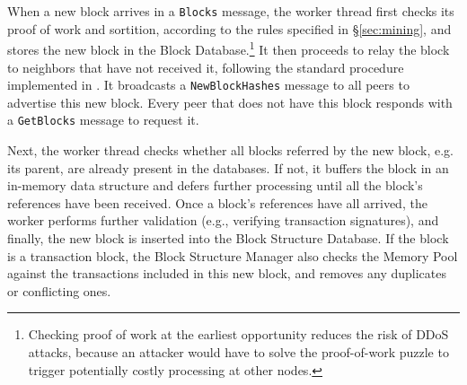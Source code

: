 When a new block arrives in a \texttt{Blocks} message, the worker thread first checks its proof of work and sortition, according to the rules specified in \S\ref{sec:mining}, and stores the new block in the Block Database.\footnote{Checking proof of work at the earliest opportunity reduces the risk of DDoS attacks, because an attacker would have to solve the proof-of-work puzzle to trigger potentially costly processing at other nodes.} It then proceeds to relay the block to neighbors that have not received it, following the standard procedure implemented in \bitcoin. It broadcasts a \texttt{NewBlockHashes} message to all peers to advertise this new block. Every peer that does not have this block responds with a \texttt{GetBlocks} message to request it. 

Next, the worker thread checks whether all blocks referred by the new block, e.g. its parent, are already present in the databases. If not, it buffers the block in an in-memory data structure and defers further processing until all the block's references have been received. Once a block's references have all arrived, the worker performs further validation (e.g., verifying transaction signatures), and finally, the new block is inserted into the Block Structure Database. If the block is a transaction block, the Block Structure Manager also checks the Memory Pool against the transactions included in this new block, and removes any duplicates or conflicting ones.  

\fi 

